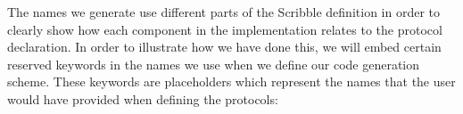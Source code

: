 \documentclass[12pt,twoside]{report}
\begin{document}


The names we generate use different parts of the Scribble definition in order to clearly show how each component in the implementation relates to the protocol declaration. In order to illustrate how we have done this, we will embed certain reserved keywords in the names we use when we define our code generation scheme. These keywords are placeholders which represent the names that the user would have provided when defining the protocols:
\end{document}
